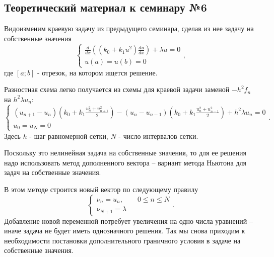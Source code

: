 \chapter{}

\section{Теоретический материал к семинару №6}

Видоизменим краевую задачу из предыдущего семинара, сделав из нее задачу на собственные значения
\begin{equation} \label{c6eq1}
	\begin{cases}
		 \displaystyle \frac{d}{dx} \left( \left( k_0 + k_1 u^2 \right) \frac{du}{dx} \right) + \lambda u = 0 \\
		u(a) = u(b) = 0
	\end{cases},
\end{equation}
где $[a; b]$ - отрезок, на котором ищется решение.

Разностная схема легко получается из схемы для краевой задачи заменой $-h^2 f_n$ на $h^2 \lambda u_n$:
\begin{equation} \label{c6eq2}
	\begin{cases}
		\displaystyle \left( u_{n+1} - u_n \right) \left( k_0 + k_1 \frac{u_n^2 + u_{n+1}^2}{2} \right) - \left( u_n - u_{n-1} \right) \left( k_0 + k_1 \frac{u_n^2 + u_{n-1}^2}{2} \right) + h^2 \lambda u_n = 0 \\
		u_0 = u_N = 0
	\end{cases}.
\end{equation}
Здесь $h$ - шаг равномерной сетки, $N$ - число интервалов сетки.

Поскольку это нелинейная задача на собственные значения, то для ее решения надо использовать метод дополненного вектора – вариант метода Ньютона для задач на собственные значения.

В этом методе строится новый вектор   по следующему правилу
\begin{equation} \label{c6eq3}
	\begin{cases}
	\nu_n = u_n, \qquad 0 \leq n \leq N\\
	\nu_{N+1} = \lambda
	\end{cases}.
\end{equation}
Добавление новой переменной потребует увеличения на одно числа уравнений – иначе задача не будет иметь однозначного решения. Так мы снова приходим к необходимости постановки дополнительного граничного условия в задаче на собственные значения.

